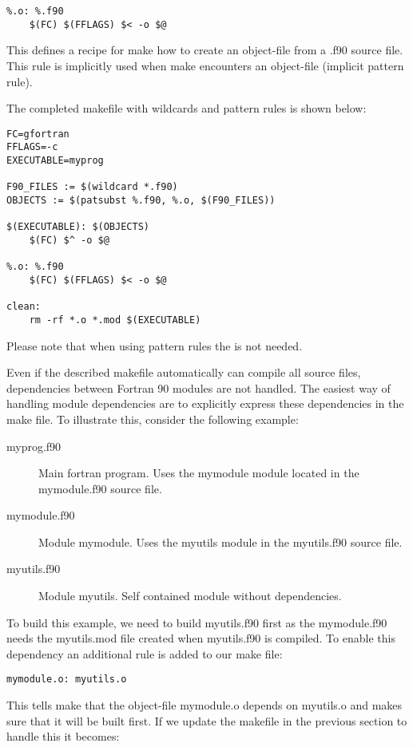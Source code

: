 \begin{lstlisting}
%.o: %.f90
	$(FC) $(FFLAGS) $< -o $@
\end{lstlisting}

This defines a recipe for make how to create an object-file from a .f90 source file. This rule is implicitly used when make encounters an object-file (implicit pattern rule).

The completed makefile with wildcards and pattern rules is shown below:

\mmode

\begin{lstlisting}
FC=gfortran
FFLAGS=-c
EXECUTABLE=myprog

F90_FILES := $(wildcard *.f90)
OBJECTS := $(patsubst %.f90, %.o, $(F90_FILES))

$(EXECUTABLE): $(OBJECTS)	
	$(FC) $^ -o $@

%.o: %.f90
	$(FC) $(FFLAGS) $< -o $@
	
clean:
	rm -rf *.o *.mod $(EXECUTABLE)
\end{lstlisting}

Please note that when using pattern rules the  is not needed.

Even if the described makefile automatically can compile all source files, dependencies between Fortran 90 modules are not handled. The easiest way of handling module dependencies are to explicitly express these dependencies in the make file. To illustrate this, consider the following example:

\begin{description}
\item[myprog.f90] Main fortran program. Uses the mymodule module located in the mymodule.f90 source file.
\item[mymodule.f90] Module mymodule. Uses the myutils module in the myutils.f90 source file.
\item[myutils.f90] Module myutils. Self contained module without dependencies.
\end{description}

To build this example, we need to build myutils.f90 first as the mymodule.f90 needs the myutils.mod file created when myutils.f90 is compiled. To enable this dependency an additional rule is added to our make file:

\begin{lstlisting}
mymodule.o: myutils.o
\end{lstlisting}

This tells make that the object-file mymodule.o depends on myutils.o and makes sure that it will be built first. If we update the makefile in the previous section to handle this it becomes:

